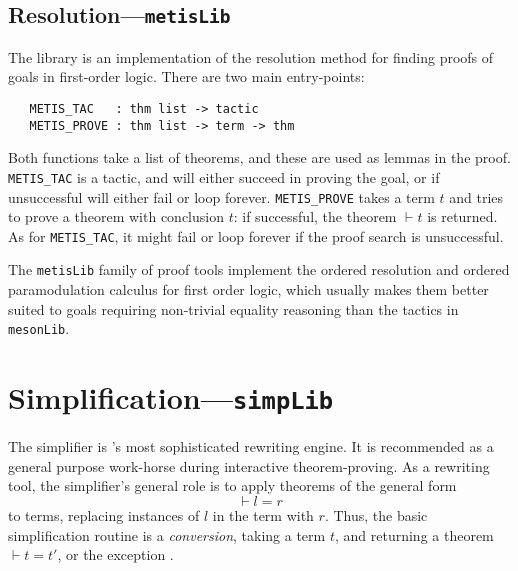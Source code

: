 \subsection{Resolution---\texttt{metisLib}}


The  library is an implementation of the resolution method
for finding proofs of goals in first-order logic. There are two main
entry-points:

\begin{verbatim}
   METIS_TAC   : thm list -> tactic
   METIS_PROVE : thm list -> term -> thm
\end{verbatim}

Both functions take a list of theorems, and these are used as lemmas
in the proof. \texttt{METIS\_TAC} is a tactic, and will either succeed
in proving the goal, or if unsuccessful will either fail or loop
forever. \texttt{METIS\_PROVE} takes a term $t$ and tries to prove a
theorem with conclusion $t$: if successful, the theorem $\vdash t$ is
returned. As for \texttt{METIS\_TAC}, it might fail or loop forever if
the proof search is unsuccessful.

The \texttt{metisLib} family of proof tools implement the ordered
resolution and ordered paramodulation calculus for first order logic,
which usually makes them better suited to goals requiring non-trivial
equality reasoning than the tactics in \texttt{mesonLib}.


\section{Simplification---\texttt{simpLib}}
\label{sec:simpLib}

The simplifier is \HOL's most sophisticated rewriting engine.  It is
recommended as a general purpose work-horse during interactive
theorem-proving.  As a rewriting tool, the simplifier's general role
is to apply theorems of the general form
\[
\vdash l = r
\]
to terms, replacing instances of $l$ in the term with $r$. Thus, the
basic simplification routine is a \emph{conversion}, taking a term
$t$, and returning a theorem $\vdash t = t'$, or the exception
.

